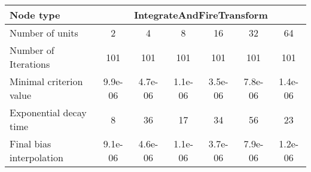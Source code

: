 \begin{tabular}{l|cccccc|}
Node type & \multicolumn{6}{c}{IntegrateAndFireTransform} \\
\hline
Number of units & 2 & 4 & 8 & 16 & 32 & 64 \\
Number of Iterations & 101 & 101 & 101 & 101 & 101 & 101 \\
Minimal criterion value & 9.9e-06 & 4.7e-06 & 1.1e-06 &  3.5e-06 & 7.8e-06 & 1.4e-06 \\
Exponential decay time & 8 & 36 & 17 &  34 & 56 & 23 \\
Final bias interpolation & 9.1e-06 & 4.6e-06 & 1.1e-06 &  3.7e-06 & 7.9e-06 & 1.2e-06 \\
\hline
\end{tabular}
